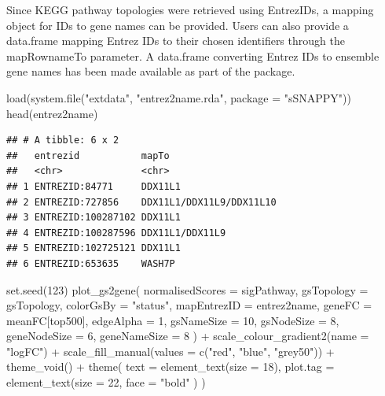 \documentclass[9pt,a4paper,]{extarticle}
\newenvironment{Shaded}{\begin{snugshade}}{\end{snugshade}}
\newcommand{\AttributeTok}[1]{\textcolor[rgb]{0.77,0.63,0.00}{#1}}
\newcommand{\DecValTok}[1]{\textcolor[rgb]{0.00,0.00,0.81}{#1}}
\newcommand{\FunctionTok}[1]{\textcolor[rgb]{0.00,0.00,0.00}{#1}}
\newcommand{\NormalTok}[1]{#1}
\newcommand{\SpecialCharTok}[1]{\textcolor[rgb]{0.00,0.00,0.00}{#1}}
\newcommand{\StringTok}[1]{\textcolor[rgb]{0.31,0.60,0.02}{#1}}
\begin{document}
Since KEGG pathway topologies were retrieved using EntrezIDs, a mapping object for IDs to gene names can be provided.
Users can also provide a data.frame mapping Entrez IDs to their chosen identifiers through the mapRownameTo parameter.
A data.frame converting Entrez IDs to ensemble gene names has been made available as part of the package.

\begin{Shaded}
\begin{Highlighting}[]
\FunctionTok{load}\NormalTok{(}\FunctionTok{system.file}\NormalTok{(}\StringTok{"extdata"}\NormalTok{, }\StringTok{"entrez2name.rda"}\NormalTok{, }\AttributeTok{package =} \StringTok{"sSNAPPY"}\NormalTok{))}
\FunctionTok{head}\NormalTok{(entrez2name)}
\end{Highlighting}
\end{Shaded}

\begin{verbatim}
## # A tibble: 6 x 2
##   entrezid           mapTo                   
##   <chr>              <chr>                   
## 1 ENTREZID:84771     DDX11L1                 
## 2 ENTREZID:727856    DDX11L1/DDX11L9/DDX11L10
## 3 ENTREZID:100287102 DDX11L1                 
## 4 ENTREZID:100287596 DDX11L1/DDX11L9         
## 5 ENTREZID:102725121 DDX11L1                 
## 6 ENTREZID:653635    WASH7P
\end{verbatim}

\begin{Shaded}
\begin{Highlighting}[]
\FunctionTok{set.seed}\NormalTok{(}\DecValTok{123}\NormalTok{)}
\FunctionTok{plot\_gs2gene}\NormalTok{(}
    \AttributeTok{normalisedScores =}\NormalTok{ sigPathway, }
    \AttributeTok{gsTopology =}\NormalTok{ gsTopology, }
    \AttributeTok{colorGsBy =} \StringTok{"status"}\NormalTok{, }
    \AttributeTok{mapEntrezID =}\NormalTok{ entrez2name, }
    \AttributeTok{geneFC =}\NormalTok{ meanFC[top500], }
    \AttributeTok{edgeAlpha =} \DecValTok{1}\NormalTok{, }
    \AttributeTok{gsNameSize =} \DecValTok{10}\NormalTok{, }
    \AttributeTok{gsNodeSize =} \DecValTok{8}\NormalTok{, }
    \AttributeTok{geneNodeSize =} \DecValTok{6}\NormalTok{, }
    \AttributeTok{geneNameSize =} \DecValTok{8}
\NormalTok{) }\SpecialCharTok{+}
    \FunctionTok{scale\_colour\_gradient2}\NormalTok{(}\AttributeTok{name =} \StringTok{"logFC"}\NormalTok{) }\SpecialCharTok{+}
    \FunctionTok{scale\_fill\_manual}\NormalTok{(}\AttributeTok{values =} \FunctionTok{c}\NormalTok{(}\StringTok{"red"}\NormalTok{, }\StringTok{"blue"}\NormalTok{, }\StringTok{"grey50"}\NormalTok{)) }\SpecialCharTok{+}
    \FunctionTok{theme\_void}\NormalTok{() }\SpecialCharTok{+}
    \FunctionTok{theme}\NormalTok{(}
        \AttributeTok{text =} \FunctionTok{element\_text}\NormalTok{(}\AttributeTok{size =} \DecValTok{18}\NormalTok{),}
        \AttributeTok{plot.tag =} \FunctionTok{element\_text}\NormalTok{(}\AttributeTok{size =} \DecValTok{22}\NormalTok{, }\AttributeTok{face =} \StringTok{"bold"}\NormalTok{ )}
\NormalTok{    )}
\end{Highlighting}
\end{Shaded}
\end{document}
